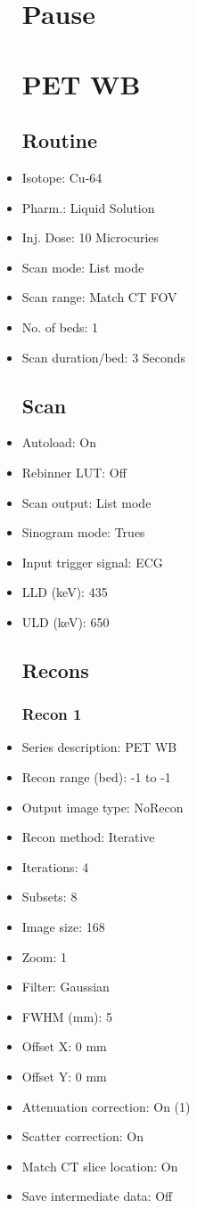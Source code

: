 \documentclass[12pt]{article}
\begin{document}
\begin{itemize}
\section{Pause}
\section{PET WB}\subsection{Routine}
\item Isotope: Cu-64
\item Pharm.: Liquid Solution
\item Inj. Dose: 10 Microcuries
\item Scan mode: List mode
\item Scan range: Match CT FOV
\item No. of beds: 1
\item Scan duration/bed: 3 Seconds
\subsection{Scan}
\item Autoload: On
\item Rebinner LUT: Off
\item Scan output: List mode
\item Sinogram mode: Trues
\item Input trigger signal: ECG
\item LLD (keV): 435
\item ULD (keV): 650
\subsection{Recons}
\subsubsection{Recon 1}
\item Series description: PET WB 
\item Recon range (bed): -1 to -1
\item Output image type: NoRecon
\item Recon method: Iterative
\item Iterations: 4
\item Subsets: 8
\item Image size: 168
\item Zoom: 1
\item Filter: Gaussian
\item FWHM (mm): 5
\item Offset X: 0 mm
\item Offset Y: 0 mm
\item Attenuation correction: On (1)
\item Scatter correction: On
\item Match CT slice location: On
\item Save intermediate data: Off

\end{itemize}
\end{document}
